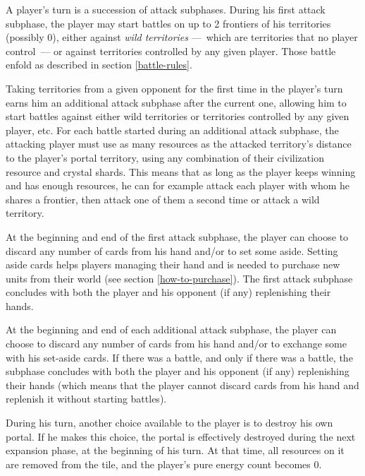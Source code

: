\documentclass[a4paper]{article}
\begin{document}
        A player's turn is a succession of attack subphases.
        During his first attack subphase, the player may start battles on up to 2 frontiers
        of his territories (possibly 0), either against \textit{wild territories}
        ---~which are territories that no player control~---
        or against territories controlled by any given player.
        Those battle enfold as described in section \ref{battle-rules}.        
        
        Taking territories from a given opponent for the first time in the player's turn
        earns him an additional attack subphase after the current one,
        allowing him to start battles against either wild territories or territories
        controlled by any given player, etc.
        For each battle started during an additional attack subphase,
        the attacking player must use as many resources as the attacked
        territory's distance to the player's portal territory,
        using any combination of their civilization resource and crystal shards.
        This means that as long as the player keeps winning and has enough resources,
        he can for example attack each player with whom he shares a frontier,
        then attack one of them a second time or attack a wild territory.
        
        At the beginning and end of the first attack subphase,
        the player can choose to discard any number of cards from his hand
        and/or to set some aside.        
        Setting aside cards helps players managing their hand
        and is needed to purchase new units from their world
        (see section \ref{how-to-purchase}).
        The first attack subphase concludes with both the player and his opponent
        (if any) replenishing their hands.
        
        At the beginning and end of each additional attack subphase,
        the player can choose to discard any number of cards from his hand
        and/or to exchange some with his set-aside cards.
        If there was a battle, and only if there was a battle,
        the subphase concludes with both the player and his opponent (if any)
        replenishing their hands (which means that the player cannot discard cards from
        his hand and replenish it without starting battles).
        
        During his turn, another choice available to the player
        is to destroy his own portal.
        If he makes this choice, the portal is effectively destroyed
        during the next expansion phase, at the beginning of his turn.
        At that time, all resources on it are removed from the tile,
        and the player's pure energy count becomes 0. 
        
\end{document}
